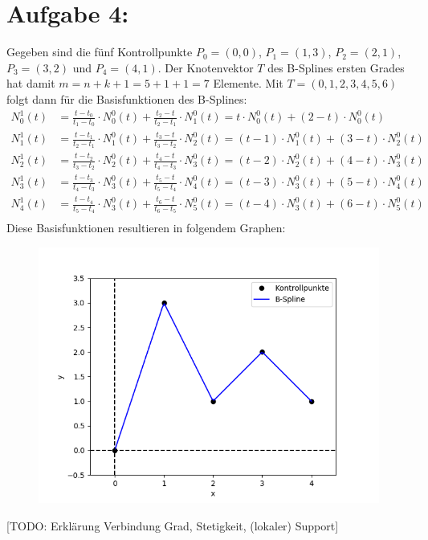 \section*{Aufgabe 4: }
Gegeben sind die fünf Kontrollpunkte $P_0 = (0, 0)$, $P_1 = (1, 3)$, $P_2 = (2, 1)$, $P_3 = (3, 2)$ und $P_4 = (4, 1)$.
Der Knotenvektor $T$ des B-Splines ersten Grades hat damit $m = n + k + 1 = 5 + 1 + 1 = 7$ Elemente. Mit $T = (0, 1, 2, 3, 4, 5, 6)$ folgt dann für die Basisfunktionen des B-Splines:
\begin{align*}
  N_0^1(t) &= \frac{t - t_0}{t_1 - t_0}\cdot N_0^0(t) + \frac{t_2 - t}{t_2 - t_1}\cdot N_1^0(t) = t \cdot N_0^0(t) + (2 - t) \cdot N_0^0(t)\\
  N_1^1(t) &= \frac{t - t_1}{t_2 - t_1}\cdot N_1^0(t) + \frac{t_3 - t}{t_3 - t_2}\cdot N_2^0(t) = (t - 1) \cdot N_1^0(t) + (3 - t) \cdot N_2^0(t)\\
  N_2^1(t) &= \frac{t - t_2}{t_3 - t_2}\cdot N_2^0(t) + \frac{t_4 - t}{t_4 - t_3}\cdot N_3^0(t) = (t - 2) \cdot N_2^0(t) + (4 - t) \cdot N_3^0(t)\\
  N_3^1(t) &= \frac{t - t_3}{t_4 - t_3}\cdot N_3^0(t) + \frac{t_5 - t}{t_5 - t_4}\cdot N_4^0(t) = (t - 3) \cdot N_3^0(t) + (5 - t) \cdot N_4^0(t)\\
  N_4^1(t) &= \frac{t - t_4}{t_5 - t_4}\cdot N_3^0(t) + \frac{t_6 - t}{t_6 - t_5}\cdot N_5^0(t) = (t - 4) \cdot N_3^0(t) + (6 - t) \cdot N_5^0(t)\\
\end{align*}
Diese Basisfunktionen resultieren in folgendem Graphen:
\begin{center}
  \begin{figure}[H]
    \includegraphics[width=\textwidth, keepaspectratio]{splines}
  \end{figure}
\end{center}
[TODO: Erklärung Verbindung Grad, Stetigkeit, (lokaler) Support]